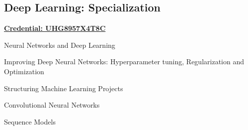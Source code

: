 \subsection{Deep Learning: Specialization}
\vspace{\topsep}
\href{https://www.coursera.org/account/accomplishments/specialization/certificate/UHG8957X4T8C}{\bf Credential: UHG8957X4T8C}
\begin{tightitemize}
\item Neural Networks and Deep Learning
\item Improving Deep Neural Networks: Hyperparameter tuning, Regularization and Optimization
\item Structuring Machine Learning Projects
\item Convolutional Neural Networks
\item Sequence Models
\end{tightitemize}

\sectionspace